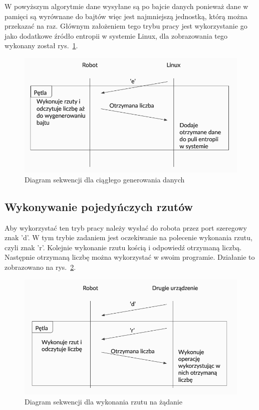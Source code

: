 W powyższym algorytmie dane wysyłane są po bajcie danych ponieważ dane w pamięci 
są wyrównane do bajtów więc jest najmniejszą jednostką, którą można przekazać na raz.
Głównym założeniem tego trybu pracy jest wykorzystanie go jako dodatkowe źródło entropii w systemie Linux, 
dla zobrazowania tego wykonany został rys.~\ref{fig:interface_a}.

\begin{figure}[H]
    \centering
    \includegraphics[width=0.5\linewidth]{chapters/05-Przetwarzanie Wyniku/figures/InterfaceA}
    \caption{Diagram sekwencji dla ciągłego generowania danych}
    \label{fig:interface_a}
\end{figure}

\subsection{Wykonywanie pojedyńczych rzutów}
Aby wykorzystać ten tryb pracy należy wysłać do robota przez port szeregowy znak 'd'.
W tym trybie zadaniem jest oczekiwanie na polecenie wykonania rzutu, czyli znak 'r'.
Kolejnie wykonanie rzutu kością i odpowiedź otrzymaną liczbą. Następnie otrzymaną 
liczbę można wykorzystać w swoim programie. Działanie to zobrazowano na rys.~\ref{fig:interface_b}.

\begin{figure}[H]
    \centering
    \includegraphics[width=0.5\linewidth]{chapters/05-Przetwarzanie Wyniku/figures/InterfaceB}
    \caption{Diagram sekwencji dla wykonania rzutu na żądanie}
    \label{fig:interface_b}
\end{figure}

